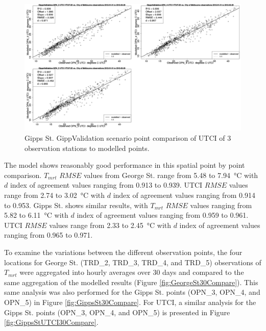\documentclass[final,3p,times,authoryear]{elsarticle}
\begin{document}
\begin{figure}[!htbp]
\includegraphics[trim = 0mm 0mm 0mm 0mm, clip, scale=0.30]{images/GippsValidation-ErrorPlots-UTCI5.png}
\caption{Gipps St. GippValidation scenario point comparison of UTCI of 3 observation stations to modelled points.\label{fig:GippsStUtciCompare}} 
\end{figure}

The model shows reasonably good performance in this spatial point by point comparison. $T_{mrt}$ $RMSE$ values from George St. range from 5.48 to 7.94\SI{}{\degreeCelsius} with $d$ index of agreement values ranging from 0.913 to 0.939. UTCI $RMSE$ values range from 2.74 to 3.02\SI{}{\degreeCelsius} with $d$ index of agreement values ranging from 0.914 to 0.953.  Gipps St. shows similar results, with $T_{mrt}$ $RMSE$ values ranging from 5.82 to 6.11\SI{}{\degreeCelsius} with $d$ index of agreement values ranging from 0.959 to 0.961. UTCI $RMSE$ values range from 2.33 to 2.45\SI{}{\degreeCelsius} with $d$ index of agreement values ranging from 0.965 to 0.971.

To examine the variations between the different observation points,  the four locations for George St. (TRD\_2, TRD\_3, TRD\_4, and TRD\_5) observations of $T_{mrt}$ were aggregated into hourly averages over 30 days and compared to the same aggregation of the modelled results (Figure \ref{fig:GeorgeSt30Compare}). This same analysis was also performed for the  Gipps St. points (OPN\_3, OPN\_4, and OPN\_5) in Figure \ref{fig:GippsSt30Compare}. For UTCI, a similar analysis for the Gipps St. points (OPN\_3, OPN\_4, and OPN\_5) is presented in Figure \ref{fig:GippsStUTCI30Compare}. 
\end{document}
